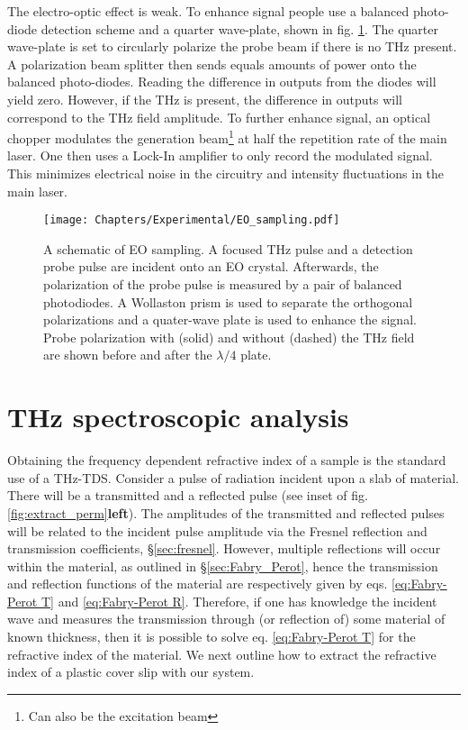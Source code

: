 The electro-optic effect is weak. To enhance signal people use a balanced photo-diode detection scheme and a quarter wave-plate, shown in fig. \ref{fig:EO_sampling}. The quarter wave-plate is set to circularly polarize the probe beam if there is no THz present. A polarization beam splitter then sends equals amounts of power onto the balanced photo-diodes. Reading the difference in outputs from the diodes will yield zero. However, if the THz is present, the difference in outputs will correspond to the THz field amplitude. To further enhance signal, an optical chopper modulates the generation beam\footnote{Can also be the excitation beam} at half the repetition rate of the main laser. One then uses a Lock-In amplifier to only record the modulated signal. This minimizes electrical noise in the circuitry and intensity fluctuations in the main laser.
\begin{figure}[h!]\centering
\texttt{[image: Chapters/Experimental/EO\_sampling.pdf]}
\caption{A schematic of EO sampling. A focused THz pulse and a detection probe pulse are incident onto an EO crystal. Afterwards, the polarization of the probe pulse is measured by a pair of balanced photodiodes. A Wollaston prism is used to separate the orthogonal polarizations and a quater-wave plate is used to enhance the signal. Probe polarization with (solid) and without (dashed) the THz field are shown before and after the $\lambda /4$ plate.}
\label{fig:EO_sampling}
\end{figure}




\section{THz spectroscopic analysis}\label{sec:extract_perm}
Obtaining the frequency dependent refractive index of a sample is the standard use of a THz-TDS. Consider a pulse of radiation incident upon a slab of material. There will be a transmitted and a reflected pulse (see inset of fig. \ref{fig:extract_perm}\textbf{left}). The amplitudes of the transmitted and reflected pulses will be related to the incident pulse amplitude via the Fresnel reflection and transmission coefficients, \S\ref{sec:fresnel}. However, multiple reflections will occur within the material, as outlined in \S\ref{sec:Fabry_Perot}, hence the transmission and reflection functions of the material are respectively given by eqs. \eqref{eq:Fabry-Perot T} and \eqref{eq:Fabry-Perot R}. Therefore, if one has knowledge the incident wave and measures the transmission through (or reflection of) some material of known thickness, then it is possible to solve eq. \eqref{eq:Fabry-Perot T} for the refractive index of the material. We next outline how to extract the refractive index of a plastic cover slip with our system.

